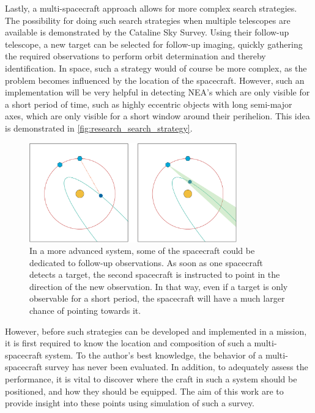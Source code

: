 Lastly, a multi-spacecraft approach allows for more complex search strategies. The possibility for doing such search strategies when multiple telescopes are available is demonstrated by the Cataline Sky Survey. Using their follow-up telescope, a new target can be selected for follow-up imaging, quickly gathering the required observations to perform orbit determination and thereby identification. In space, such a strategy would of course be more complex, as the problem becomes influenced by the location of the spacecraft. However, such an implementation will be very helpful in detecting NEA's which are only visible for a short period of time, such as highly eccentric objects with long semi-major axes, which are only visible for a short window around their perihelion. This idea is demonstrated in \autoref{fig:research_search_strategy}.\\

\begin{figure}[htbp]
 \centering
 \includegraphics[width=0.8\textwidth]{img/research_search_strategy.png}
 \caption{In a more advanced system, some of the spacecraft could be dedicated to follow-up observations. As soon as one spacecraft detects a target, the second spacecraft is instructed to point in the direction of the new observation. In that way, even if a target is only observable for a short period, the spacecraft will have a much larger chance of pointing towards it.}
 \label{fig:research_search_strategy}
\end{figure}


However, before such strategies can be developed and implemented in a mission, it is first required to know the location and composition of such a multi-spacecraft system. To the author's best knowledge, the behavior of a multi-spacecraft survey has never been evaluated. In addition, to adequately assess the performance, it is vital to discover where the craft in such a system should be positioned, and how they should be equipped. The aim of this work are to provide insight into these points using simulation of such a survey.

